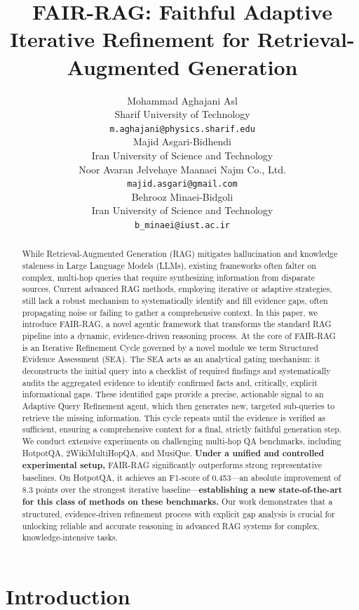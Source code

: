 \documentclass[11pt]{article}
\title{FAIR-RAG: Faithful Adaptive Iterative Refinement for Retrieval-Augmented Generation}
\author{Mohammad Aghajani Asl \\
  Sharif University of Technology \\
  \texttt{m.aghajani@physics.sharif.edu} \\
  \AND
  Majid Asgari-Bidhendi \\
  Iran University of Science and Technology \\
  Noor Avaran Jelvehaye Maanaei Najm Co., Ltd. \\
  \texttt{majid.asgari@gmail.com} \\
  \AND
  Behrooz Minaei-Bidgoli \\
  Iran University of Science and Technology \\
  \texttt{b\_minaei@iust.ac.ir} \\}
\begin{document}
\maketitle
\begin{abstract}
While Retrieval-Augmented Generation (RAG) mitigates hallucination and knowledge staleness in Large Language Models (LLMs), existing frameworks often falter on complex, multi-hop queries that require synthesizing information from disparate sources. Current advanced RAG methods, employing iterative or adaptive strategies, still lack a robust mechanism to systematically identify and fill evidence gaps, often propagating noise or failing to gather a comprehensive context. In this paper, we introduce FAIR-RAG, a novel agentic framework that transforms the standard RAG pipeline into a dynamic, evidence-driven reasoning process. At the core of FAIR-RAG is an Iterative Refinement Cycle governed by a novel module we term Structured Evidence Assessment (SEA). The SEA acts as an analytical gating mechanism: it deconstructs the initial query into a checklist of required findings and systematically audits the aggregated evidence to identify confirmed facts and, critically, explicit informational gaps. These identified gaps provide a precise, actionable signal to an Adaptive Query Refinement agent, which then generates new, targeted sub-queries to retrieve the missing information. This cycle repeats until the evidence is verified as sufficient, ensuring a comprehensive context for a final, strictly faithful generation step. We conduct extensive experiments on challenging multi-hop QA benchmarks, including HotpotQA, 2WikiMultiHopQA, and MusiQue. \textbf{Under a unified and controlled experimental setup,} FAIR-RAG significantly outperforms strong representative baselines. On HotpotQA, it achieves an F1-score of 0.453---an absolute improvement of 8.3 points over the strongest iterative baseline---\textbf{establishing a new state-of-the-art for this class of methods on these benchmarks.} Our work demonstrates that a structured, evidence-driven refinement process with explicit gap analysis is crucial for unlocking reliable and accurate reasoning in advanced RAG systems for complex, knowledge-intensive tasks.
\end{abstract}

\section{Introduction}
\end{document}
